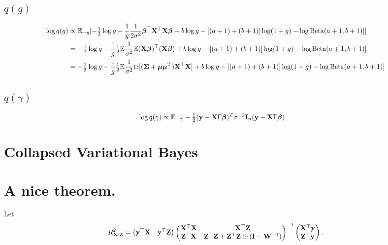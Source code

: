 \documentclass{amsart}[12pt]
\begin{document}
\subsection{$q(g)$}
\begin{align*}
\log q(g) &\propto \mathbb{E}_{-g} [-\tfrac{1}{2} \log g - \frac{1}{g} \frac{1}{2 \sigma^2} {\boldsymbol \beta}^\top {\bf X}^\top {\bf X} {\boldsymbol\beta} + b \log g - [(a + 1) + (b + 1)] \log(1 + g) - \log \text{Beta} (a + 1, b + 1)]] \\
&= -\tfrac{1}{2} \log g - \frac{1}{g} \tfrac{1}{2} \mathbb{E} \frac{1}{\sigma^2} \mathbb{E} ({\bf X} {\boldsymbol \beta})^\top ({\bf X} {\boldsymbol \beta}) + b \log g - [(a + 1) + (b + 1)] \log(1 + g) - \log \text{Beta} (a + 1, b + 1)] \\
&= -\tfrac{1}{2} \log g - \frac{1}{g} \tfrac{1}{2} \mathbb{E} \frac{1}{\sigma^2} \text{tr}[({\boldsymbol \Sigma} + {\boldsymbol \mu} {\boldsymbol \mu}^T) {\bf X}^\top {\bf X}] + b \log g - [(a + 1) + (b + 1)] \log(1 + g) - \log \text{Beta} (a + 1, b + 1)] \\
\end{align*}

\subsection{$q(\gamma)$}
\begin{align*}
\log q(\gamma) &\propto \mathbb{E}_{-\gamma} -\tfrac{1}{2} ({\bf y} - {\bf X} \Gamma {\boldsymbol\beta})^T \sigma^{-2} {\bf I}_n ({\bf y} - {\bf X} \Gamma {\boldsymbol\beta})
\end{align*}

\section{Collapsed Variational Bayes}


\section{A nice theorem.}
Let
\begin{equation*}
R^2_{{\bf X}, {\bf Z}} = 
\begin{pmatrix}
{\bf y}^\top {\bf X} & {\bf y}^\top {\bf Z}
\end{pmatrix}
\begin{pmatrix}
{\bf X}^\top {\bf X} & {\bf X}^\top {\bf Z} \\
{\bf Z}^\top {\bf X} & {\bf Z}^\top {\bf Z} + {\bf Z}^\top {\bf Z} \odot ({\bf I} - {\bf W}^{-1})
\end{pmatrix}^{-1}
\begin{pmatrix}
{\bf X}^\top {\bf y}\\
{\bf Z}^\top {\bf y}
\end{pmatrix}.
\end{equation*}
\end{document}

